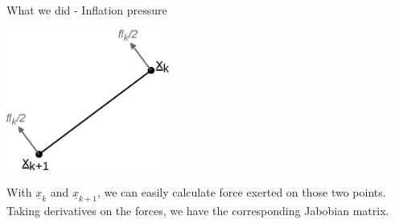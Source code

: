 \documentclass{beamer}
\begin{document}
	\begin{frame}{What we did - Inflation pressure}
		\begin{center}
			\includegraphics[width=0.4\textwidth]{res/inflation.png}
		\end{center}
	
		With $\underline x_k$ and $\underline x_{k+1}$, we can easily calculate force exerted on those two points. Taking derivatives on the forces, we have the corresponding Jabobian matrix. 
	\end{frame}
\end{document}
